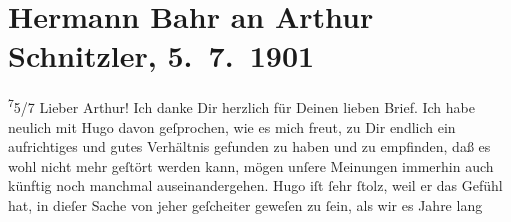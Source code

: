 

         
         \renewcommand{\erwaehntePersonen}{Personen: Leopold von Andrian-Werburg, Gustav Davis, Gustave Flaubert, Hugo von Hofmannsthal,  Phillipp II. von Spanien, Eduard Pötzl, Diego Rodríguez de Silva y Velázquez}
         \renewcommand{\erwaehnteInstitutionen}{Institutionen: Kikeriki, Reichswehr}
         \renewcommand{\erwaehnteOrte}{Orte: Wien, Österreich}
         \renewcommand{\erwaehnteWerke}{}
               \section[Hermann Bahr an Arthur Schnitzler, 5. 7. 1901]{ Hermann Bahr an Arthur Schnitzler, 5. 7. 1901}\nopagebreak{}\rehead{ }\begin{ledgroupsized}[t]{13cm}\normalsize\beginnumbering \toendnotes[C]{\smallbreak\pagebreak[2]} 
\toendnotes[C]{\smallbreak}\pstart
           \raggedleft{}{\pb}\substVorne{}\textsuperscript{7}\substDazwischen{}5\substHinten{}/7\pend
           \pstart\center{}Lieber Arthur!\pend\pstart
           Ich danke Dir herzlich für Deinen lieben Brief. Ich habe neulich mit Hugo davon geſprochen, wie es mich freut, zu
               Dir endlich ein aufrichtiges und gutes Verhältnis gefunden zu haben und zu empfinden,
               daß \introOben{}es\introOben{} wohl nicht mehr geſtört werden kann, mögen unſere
               Meinungen immerhin auch künftig noch manchmal auseinandergehen.\pend
           \pstart
           {\pb}Hugo iſt ſehr ſtolz, weil er das Gefühl hat,
               in dieſer Sache von jeher geſcheiter geweſen zu ſein, als wir es Jahre lang

\end{ledgroupsized}
